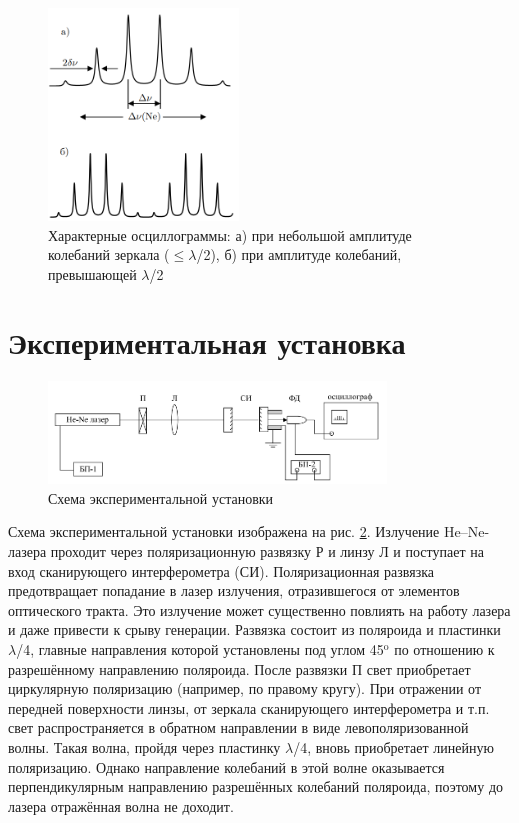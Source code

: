 \documentclass[a4paper,12pt]{article} %
\begin{document}
\begin{figure}
    \centering
    \includegraphics[width=0.45\textwidth]{oscillog.png}
    \caption{Характерные осциллограммы: а) при небольшой амплитуде
колебаний зеркала ($\leq\lambda$/2), б) при амплитуде колебаний, превышающей $\lambda$/2}
    \label{fig:oscillog}
\end{figure}

\section{Экспериментальная установка}
\begin{figure}[h]
    \centering
    \includegraphics[width=0.8\textwidth]{setup.png}
    \caption{Схема экспериментальной установки}
    \label{fig:setup}
\end{figure}
Схема экспериментальной установки изображена на рис. \ref{fig:setup}.
Излучение He–Ne-лазера проходит через поляризационную развязку Р и линзу Л и поступает на вход сканирующего интерферометра (СИ). Поляризационная развязка предотвращает попадание в лазер излучения, отразившегося от элементов 
 оптического тракта. Это излучение может существенно повлиять на работу лазера и даже привести к срыву генерации. Развязка состоит из поляроида и пластинки $\lambda$/4, главные направления которой установлены под углом 45$^\text{o}$ по отношению к разрешённому направлению поляроида. После развязки П свет приобретает циркулярную поляризацию (например, по правому кругу). При отражении от передней поверхности линзы, от зеркала сканирующего интерферометра и т.п. свет распространяется в обратном направлении в виде левополяризованной волны. Такая волна, пройдя через пластинку $\lambda$/4, вновь приобретает линейную поляризацию. Однако направление колебаний в этой волне оказывается перпендикулярным направлению разрешённых колебаний поляроида, поэтому до лазера отражённая волна не доходит. 
\end{document}
